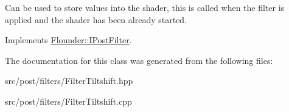Can be used to store values into the shader, this is called when the filter is applied and the shader has been already started. 



Implements \hyperlink{class_flounder_1_1_i_post_filter_a20420ec0a9bac67437740552bea9ab74}{Flounder\+::\+I\+Post\+Filter}.



The documentation for this class was generated from the following files\+:\begin{DoxyCompactItemize}
\item 
src/post/filters/Filter\+Tiltshift.\+hpp\item 
src/post/filters/Filter\+Tiltshift.\+cpp\end{DoxyCompactItemize}
